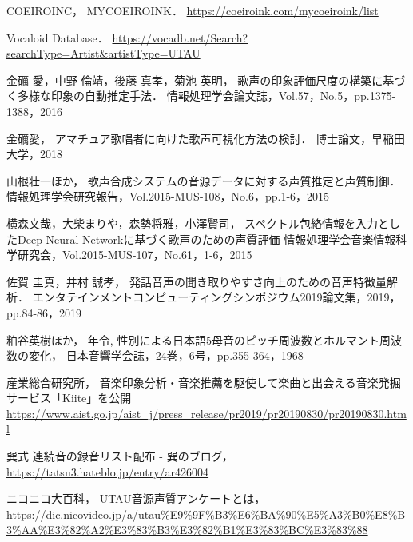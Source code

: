 \documentclass[a4j,8pt,twocolumn]{extarticle}
\begin{document}
\begin{thebibliography}{9}
COEIROINC，
MYCOEIROINK．
\url{https://coeiroink.com/mycoeiroink/list}

Vocaloid Database．
\url{https://vocadb.net/Search?searchType=Artist&artistType=UTAU}

金礪 愛，中野 倫靖，後藤 真孝，菊池 英明，
歌声の印象評価尺度の構築に基づく多様な印象の自動推定手法．
情報処理学会論文誌，Vol.57，No.5，pp.1375-1388，2016

金礪愛，
アマチュア歌唱者に向けた歌声可視化方法の検討．
博士論文，早稲田大学，2018

山根壮一ほか，
歌声合成システムの音源データに対する声質推定と声質制御．
情報処理学会研究報告，Vol.2015-MUS-108，No.6，pp.1-6，2015

横森文哉，大柴まりや，森勢将雅，小澤賢司，
スペクトル包絡情報を入力としたDeep Neural Networkに基づく歌声のための声質評価
情報処理学会音楽情報科学研究会，Vol.2015-MUS-107，No.61，1-6，2015

佐賀 圭真，井村 誠孝，
発話音声の聞き取りやすさ向上のための音声特徴量解析．
エンタテインメントコンピューティングシンポジウム2019論文集，2019，pp.84-86，2019

粕谷英樹ほか，
年令, 性別による日本語5母音のピッチ周波数とホルマント周波数の変化，
日本音響学会誌，24巻，6号，pp.355-364，1968

産業総合研究所，
音楽印象分析・音楽推薦を駆使して楽曲と出会える音楽発掘サービス「Kiite」を公開
\url{https://www.aist.go.jp/aist_j/press_release/pr2019/pr20190830/pr20190830.html}

巽式 連続音の録音リスト配布 - 巽のブログ，
\url{https://tatsu3.hateblo.jp/entry/ar426004}

ニコニコ大百科，
UTAU音源声質アンケートとは，
\url{https://dic.nicovideo.jp/a/utau%E9%9F%B3%E6%BA%90%E5%A3%B0%E8%B3%AA%E3%82%A2%E3%83%B3%E3%82%B1%E3%83%BC%E3%83%88}

\end{thebibliography}


\end{document}
